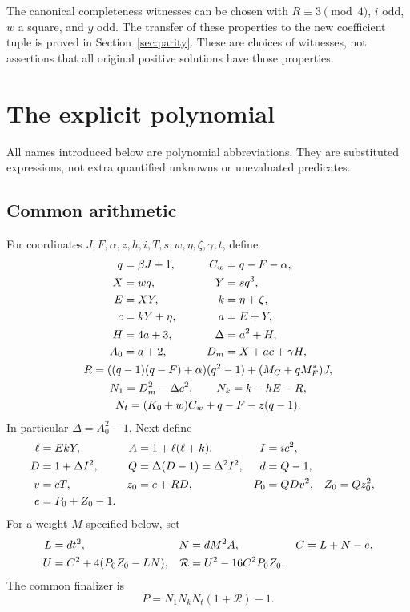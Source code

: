 \documentclass[11pt]{article}
\theoremstyle{definition}\newtheorem{definition}[theorem]{Definition}
\theoremstyle{remark}\newtheorem{remark}[theorem]{Remark}
\newcommand{\Res}{\mathcal R}\newcommand{\pc}{\operatorname{pc}}
\begin{document}
The canonical completeness witnesses can be chosen with $R\equiv3\pmod4$, $i$ odd, $w$ a square, and $y$ odd. The transfer of these properties to the new coefficient tuple is proved in Section~\ref{sec:parity}. These are choices of witnesses, not assertions that all original positive solutions have those properties.

\section{The explicit polynomial}
\label{sec:polynomial}
All names introduced below are polynomial abbreviations. They are substituted expressions, not extra quantified unknowns or unevaluated predicates.

\subsection{Common arithmetic}
For coordinates $J,F,\alpha,z,h,i,T,s,w,\eta,\zeta,\gamma,t$, define
\begin{gather}
\begin{aligned}
q&=\beta J+1,&\qquad C_w&=q-F-\alpha,\\
X&=wq,& Y&=sq^3,\\
E&=XY,& k&=\eta+\zeta,\\
c&=kY+\eta,& a&=E+Y,\\
H&=4a+3,& \Delta&=a^2+H,\\
A_0&=a+2,& D_m&=X+ac+\gamma H,
\end{aligned}\notag\\
R=((q-1)(q-F)+\alpha)(q^2-1)+(M_C+qM_F^*)J,\notag\\
N_1=D_m^2-\Delta c^2,\qquad N_k=k-hE-R,\notag\\
N_t=(K_0+w)C_w+q-F-z(q-1).
\label{eq:common}
\end{gather}
In particular $\Delta=A_0^2-1$. Next define
\begin{align}
\ell&=EkY,& A&=1+\ell(\ell+k),& I&=ic^2,\notag\\
D&=1+\Delta I^2,& Q&=\Delta(D-1)=\Delta^2 I^2,& d&=Q-1,\notag\\
v&=cT,& z_0&=c+RD,&
P_0&=QDv^2,& Z_0&=Qz_0^2,\notag\\
e&=P_0+Z_0-1.& &&
\label{eq:rootdata}
\end{align}
For a weight $M$ specified below, set
\begin{align}
L&=dt^2,& N&=dM^2A,& C&=L+N-e,\notag\\
U&=C^2+4(P_0Z_0-LN),&
\Res&=U^2-16C^2P_0Z_0.\label{eq:resultant}
\end{align}
The common finalizer is
\begin{equation}
\boxed{\ P=N_1N_kN_t(1+\Res)-1.\ }\label{eq:polynomial}
\end{equation}
\end{document}
